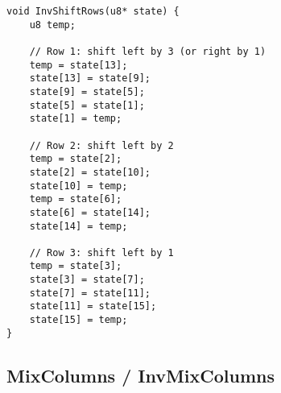 \newpage
\begin{lstlisting}[style=C, caption={Inverse ShiftRows},captionpos=t]
void InvShiftRows(u8* state) {
	u8 temp;
	
	// Row 1: shift left by 3 (or right by 1)
	temp = state[13];
	state[13] = state[9];
	state[9] = state[5];
	state[5] = state[1];
	state[1] = temp;
	
	// Row 2: shift left by 2
	temp = state[2];
	state[2] = state[10];
	state[10] = temp;
	temp = state[6];
	state[6] = state[14];
	state[14] = temp;
	
	// Row 3: shift left by 1
	temp = state[3];
	state[3] = state[7];
	state[7] = state[11];
	state[11] = state[15];
	state[15] = temp;
}
\end{lstlisting}

\newpage
\subsection{MixColumns / InvMixColumns}
